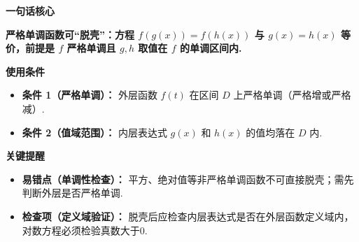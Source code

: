 \begin{summarybox}
	\textbf{\textcolor{CSummary}{一句话核心}}

	\textbf{严格单调函数可“脱壳”：方程 $f(g(x))=f(h(x))$ 与 $g(x)=h(x)$ 等价，前提是 $f$ 严格单调且 $g,h$ 取值在 $f$ 的单调区间内.}

	\medskip
	\textbf{\textcolor{CSummary}{使用条件}}
	\begin{itemize}[leftmargin=*, itemsep=0.5em, topsep=0.4em]
		\item \textbf{条件 1（严格单调）：} 外层函数 $f(t)$ 在区间 $D$ 上严格单调（严格增或严格减）.
		\item \textbf{条件 2（值域范围）：} 内层表达式 $g(x)$ 和 $h(x)$ 的值均落在 $D$ 内.
	\end{itemize}

	\medskip
	\textbf{\textcolor{CSummary}{关键提醒}}
	\begin{itemize}[leftmargin=*, itemsep=0.5em, topsep=0.4em]
		\item \textbf{易错点（单调性检查）：} 平方、绝对值等非严格单调函数不可直接脱壳；需先判断外层是否严格单调.
		\item \textbf{检查项（定义域验证）：} 脱壳后应检查内层表达式是否在外层函数定义域内，对数方程必须检验真数大于0.
	\end{itemize}
\end{summarybox}
